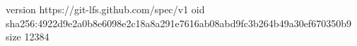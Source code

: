 version https://git-lfs.github.com/spec/v1
oid sha256:4922d9e2a0b8e6098e2c18a8a291e7616ab08abd9fc3b264b49a30ef670350b9
size 12384

